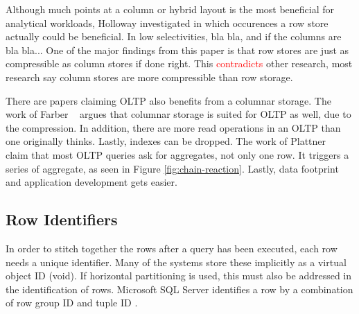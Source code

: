 Although much points at a column or hybrid layout is the most beneficial for analytical workloads, Holloway \ea \cite{Holloway2008-rr} investigated in which occurences a row store actually could be beneficial. In low selectivities, bla bla, and if the columns are bla bla... One of the major findings from this paper is that row stores are just as compressible as column stores if done right. This \textcolor{red}{contradicts} other research, most research say column stores are more compressible than row storage. 

There are papers claiming OLTP also benefits from a columnar storage. The work of Farber \ea~\cite{Farber2012-vh} argues that columnar storage is suited for OLTP as well, due to the compression. In addition, there are more read operations in an OLTP than one originally thinks. Lastly, indexes can be dropped. The work of Plattner \ea~\cite{Plattner2014-fr} claim that most OLTP queries ask for aggregates, not only one row. It triggers a series of aggregate, as seen in Figure \ref{fig:chain-reaction}. Lastly, data footprint and application development gets easier.

\subsection{Row Identifiers}
\label{sub:Row Identifiers}
In order to stitch together the rows after a query has been executed, each row needs a unique identifier. Many of the systems store these implicitly \cite{Boncz2002-yj, Raman2013-em, Stonebraker2005-qz, Lamb2012-kg} as a virtual object ID (void). If horizontal partitioning is used, this must also be addressed in the identification of rows. Microsoft SQL Server identifies a row by a combination of row group ID and tuple ID \cite{Larson2013-mc}.

